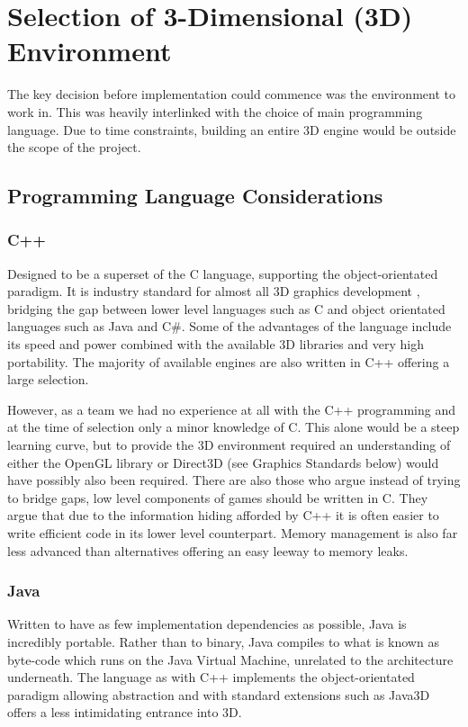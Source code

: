 
\section{Selection of 3-Dimensional (3D) Environment}

The key decision before implementation could commence was the environment
to work in. This was heavily interlinked with the choice of main
programming language. Due to time constraints, building an entire 3D
engine would be outside the scope of the project.


\subsection{Programming Language Considerations}


\subsubsection{C++}

Designed to be a superset of the C language, supporting the object-orientated
paradigm. It is industry standard for almost all 3D graphics development
\cite{Wilson2006}, bridging the gap between lower level languages
such as C and object orientated languages such as Java and C\#. Some of the advantages of the
language include its speed and power combined with the available 3D libraries and very
high portability. The majority of available engines
are also written in C++ offering a large selection.

However, as a team we had no experience at all with the C++ programming
and at the time of selection only a minor knowledge of C. This alone
would be a steep learning curve, but to provide the 3D environment
required an understanding of either the OpenGL library or Direct3D
(see Graphics Standards below) would have possibly also been required.
There are also those who argue instead of trying to bridge gaps, low
level components of games should be written in C. They argue that due to
the information hiding afforded by C++ it is often easier to write
efficient code in its lower level counterpart\cite{Wilson2006}. Memory
management is also far less advanced than alternatives offering an
easy leeway to memory leaks.

\subsubsection{Java}

Written to have as few implementation dependencies as possible, Java
is incredibly portable\cite{AboutJava}. Rather than to binary, Java
compiles to what is known as byte-code which runs on the Java Virtual
Machine, unrelated to the architecture underneath. The language as
with C++ implements the object-orientated paradigm allowing abstraction
and with standard extensions such as Java3D offers a less intimidating
entrance into 3D.


